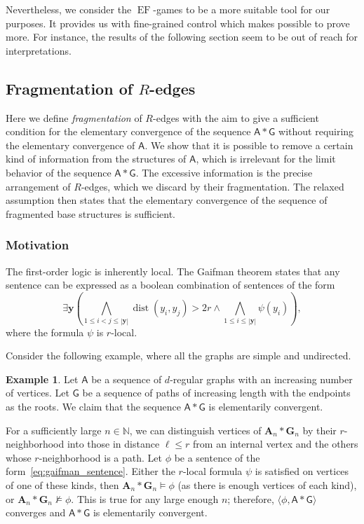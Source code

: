 \documentclass[11pt]{article}
\theoremstyle{plain}
\theoremstyle{definition}
\newtheorem{example}{Example}
\theoremstyle{remark}
\newcommand{\bigland}{\bigwedge}
\DeclareMathOperator\dist{dist}
\newcommand{\N}{\mathbb{N}}
\DeclareMathOperator{\EF}{EF}
\newcommand{\stonepar}[2]{\langle #1, #2 \rangle}
\newcommand{\str}[1]{\mathbf{#1}}
\newcommand{\strseq}[1]{{\boldsymbol{\mathsf{#1}}}}
\newcommand{\tpl}[1]{{\bm{#1}}}
\begin{document}
Nevertheless, we consider the $\EF$-games to be a more suitable tool for our purposes.
It provides us with fine-grained control which makes possible to prove more.
For instance, the results of the following section seem to be out of reach for interpretations.

\subsection[Fragmentation of R-edges]{Fragmentation of $R$-edges}\label{ssec:fragmentation}

Here we define \emph{fragmentation} of $R$-edges with the aim to give a sufficient condition for the elementary convergence of the sequence $\strseq{A} * \strseq{G}$ without requiring the elementary convergence of $\strseq{A}$.
We show that it is possible to remove a certain kind of information from the structures of $\strseq{A}$, which is irrelevant for the limit behavior of the sequence $\strseq{A} * \strseq{G}$.
The excessive information is the precise arrangement of $R$-edges, which we discard by their fragmentation.
The relaxed assumption then states that the elementary convergence of the sequence of fragmented base structures is sufficient.

\subsubsection{Motivation}\label{sssec:motivation_for_fragmentation}

The first-order logic is inherently local.
The Gaifman theorem states that any sentence can be expressed as a boolean combination of sentences of the form
\begin{equation}\label{eq:gaifman_sentence}
    \exists \tpl{y} 
    \left(
        \bigland_{1 \leq i < j \leq |\tpl{y}|} \dist(y_i, y_j) > 2r
        \land
        \bigland_{1 \leq i \leq |\tpl{y}|} \psi(y_i)
    \right)
    ,
\end{equation}
where the formula $\psi$ is $r$-local.

Consider the following example, where all the graphs are simple and undirected.

\begin{example}
    Let $\strseq{A}$ be a sequence of $d$-regular graphs with an increasing number of vertices.
    Let $\strseq{G}$ be a sequence of paths of increasing length with the endpoints as the roots.
    We claim that the sequence $\strseq{A}*\strseq{G}$ is elementarily convergent.

    For a sufficiently large $n \in \N$, we can distinguish vertices of $\str{A}_n * \str{G}_n$ by their $r$-neighborhood into those in distance $\ell \leq r$ from an internal vertex and the others whose $r$-neighborhood is a path.
    Let $\phi$ be a sentence of the form~\eqref{eq:gaifman_sentence}.
    Either the $r$-local formula $\psi$ is satisfied on vertices of one of these kinds, then $\str{A}_n * \str{G}_n \models \phi$ (as there is enough vertices of each kind), or $\str{A}_n * \str{G}_n \not\models \phi$.
    This is true for any large enough $n$; therefore, $\stonepar{\phi}{\strseq{A}*\strseq{G}}$ converges and $\strseq{A}*\strseq{G}$ is elementarily convergent.
\end{example}
\end{document}
